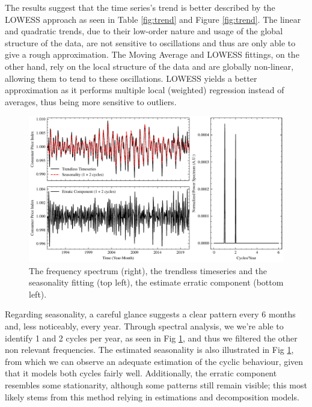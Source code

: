 \documentclass[conference]{IEEEtran}
\begin{document}
The results suggest that the time series's trend is better described by the LOWESS approach as seen in Table \ref{fig:trend} and Figure \ref{fig:trend}. The linear and quadratic trends, due to their low-order nature and usage of the global structure of the data, are not sensitive to oscillations and thus are only able to give a rough approximation. The Moving Average and LOWESS fittings, on the other hand, rely on the local structure of the data and are globally non-linear, allowing them to tend to these oscillations. LOWESS yields a better approximation as it performs multiple local (weighted) regression instead of averages, thus being more sensitive to outliers.

\begin{figure}[hbtp]
    \centering
    \includegraphics{../figs/season.pdf}
    \caption{The frequency spectrum (right), the trendless timeseries and the seasonality fitting (top left), the estimate erratic component (bottom left).}
    \label{fig:season}
\end{figure}

Regarding seasonality, a careful glance suggests a clear pattern every 6 months and, less noticeably, every year. Through spectral analysis, we we're able to identify 1 and 2 cycles per year, as seen in Fig \ref{fig:season}, and thus we filtered the other non relevant frequencies. The estimated seasonality is also illustrated in Fig \ref{fig:season}, from which we can observe an adequate estimation of the cyclic behaviour, given that it models both cycles fairly well. Additionally, the erratic component resembles some stationarity, although some patterns still remain visible; this most likely stems from this method relying in estimations and decomposition models.
\end{document}
